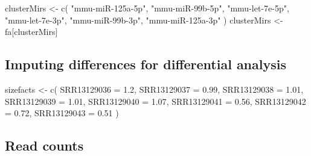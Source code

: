 \documentclass[12pt,twoside]{reedthesis}
\newenvironment{Shaded}{\begin{snugshade}}{\end{snugshade}}
\newcommand{\AttributeTok}[1]{\textcolor[rgb]{0.77,0.63,0.00}{#1}}
\newcommand{\FloatTok}[1]{\textcolor[rgb]{0.00,0.00,0.81}{#1}}
\newcommand{\FunctionTok}[1]{\textcolor[rgb]{0.00,0.00,0.00}{#1}}
\newcommand{\NormalTok}[1]{#1}
\newcommand{\OtherTok}[1]{\textcolor[rgb]{0.56,0.35,0.01}{#1}}
\newcommand{\StringTok}[1]{\textcolor[rgb]{0.31,0.60,0.02}{#1}}
\begin{document}
\begin{Shaded}
\begin{Highlighting}[]
\NormalTok{clusterMirs }\OtherTok{\textless{}{-}} \FunctionTok{c}\NormalTok{(}
  \StringTok{"mmu{-}miR{-}125a{-}5p"}\NormalTok{, }\StringTok{"mmu{-}miR{-}99b{-}5p"}\NormalTok{, }\StringTok{"mmu{-}let{-}7e{-}5p"}\NormalTok{,}
  \StringTok{"mmu{-}let{-}7e{-}3p"}\NormalTok{, }\StringTok{"mmu{-}miR{-}99b{-}3p"}\NormalTok{, }\StringTok{"mmu{-}miR{-}125a{-}3p"}
\NormalTok{)}
\NormalTok{clusterMirs }\OtherTok{\textless{}{-}}\NormalTok{ fa[clusterMirs]}
\end{Highlighting}
\end{Shaded}
\hypertarget{imputing-differences-for-differential-analysis}{%
\subsection*{Imputing differences for differential analysis}\label{imputing-differences-for-differential-analysis}}
\begin{Shaded}
\begin{Highlighting}[]
\NormalTok{sizefacts }\OtherTok{\textless{}{-}} \FunctionTok{c}\NormalTok{(}
  \AttributeTok{SRR13129036 =} \FloatTok{1.2}\NormalTok{, }\AttributeTok{SRR13129037 =} \FloatTok{0.99}\NormalTok{, }\AttributeTok{SRR13129038 =} \FloatTok{1.01}\NormalTok{,}
  \AttributeTok{SRR13129039 =} \FloatTok{1.01}\NormalTok{, }\AttributeTok{SRR13129040 =} \FloatTok{1.07}\NormalTok{, }\AttributeTok{SRR13129041 =} \FloatTok{0.56}\NormalTok{,}
  \AttributeTok{SRR13129042 =} \FloatTok{0.72}\NormalTok{, }\AttributeTok{SRR13129043 =} \FloatTok{0.51}
\NormalTok{)}
\end{Highlighting}
\end{Shaded}
\hypertarget{read-counts}{%
\subsection*{Read counts}\label{read-counts}}
\end{document}
